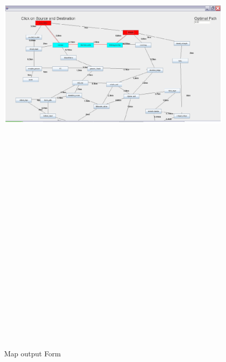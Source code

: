 \begin{center}
\begin{figure}[H]
\includegraphics[width=16cm,height=36cm]{mop.eps}
\caption{Map output Form}
\end{figure}


\end{center}
